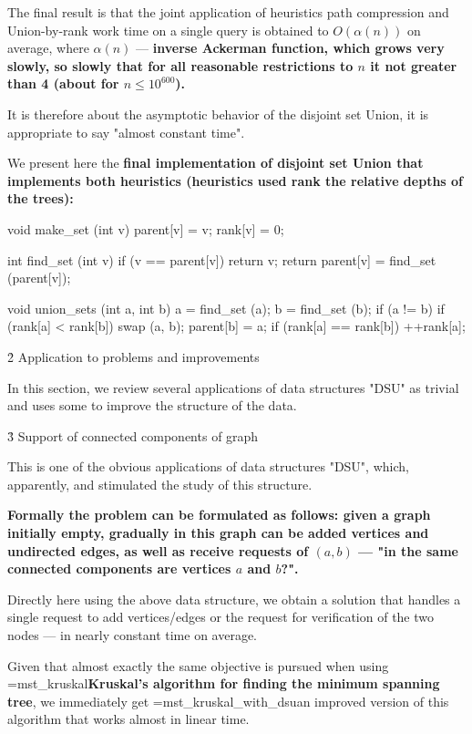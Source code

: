 The final result is that the joint application of heuristics path compression and Union-by-rank work time on a single query is obtained to $O (\alpha(n))$ on average, where $\alpha(n)$ --- \bf{inverse Ackerman function}, which grows very slowly, so slowly that for all reasonable restrictions to $n$ it \bf{not greater than 4} (about for $n \le 10^{600}$).

It is therefore about the asymptotic behavior of the disjoint set Union, it is appropriate to say "almost constant time".

We present here the \bf{final implementation of disjoint set Union} that implements both heuristics (heuristics used rank the relative depths of the trees):

\code
void make_set (int v) {
parent[v] = v;
rank[v] = 0;
}

int find_set (int v) {
if (v == parent[v])
return v;
return parent[v] = find_set (parent[v]);
}

void union_sets (int a, int b) {
a = find_set (a);
b = find_set (b);
if (a != b) {
if (rank[a] < rank[b])
swap (a, b);
parent[b] = a;
if (rank[a] == rank[b])
++rank[a];
}
}
\endcode




\h2{ Application to problems and improvements }

In this section, we review several applications of data structures "DSU" as trivial and uses some to improve the structure of the data.



\h3{ Support of connected components of graph }

This is one of the obvious applications of data structures "DSU", which, apparently, and stimulated the study of this structure.

\bf{Formally} the problem can be formulated as follows: given a graph initially empty, gradually in this graph can be added vertices and undirected edges, as well as receive requests of $(a,b)$ --- "in the same connected components are vertices $a$ and $b$?".

Directly here using the above data structure, we obtain a solution that handles a single request to add vertices/edges or the request for verification of the two nodes --- in nearly constant time on average.

Given that almost exactly the same objective is pursued when using \algohref=mst_kruskal{\bf{Kruskal's algorithm for finding the minimum spanning tree}}, we immediately get \algohref=mst_kruskal_with_dsu{an improved version of this algorithm} that works almost in linear time.

